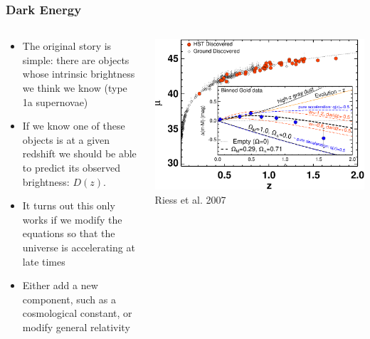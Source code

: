 \documentclass{beamer}
\begin{document}
\frame
{
    \frametitle{Dark Energy}

    \fontsize{9}{0.8\baselineskip}
    \begin{columns}
        \begin{column}{0.5\textwidth}    
            \begin{itemize}

                \item The original story is simple: there are objects whose
                    intrinsic brightness we think we know (type 1a supernovae)

                \item If we know one of these objects is at a given redshift we
                    should be able to predict its observed brightness: $D(z)$.

                \item It turns out this only works if we modify the equations
                    so that the universe is accelerating at late times


                \item Either add a new component, such as a cosmological constant,
                    or modify general relativity

            \end{itemize}
        \end{column}
        \begin{column}{0.5\textwidth}
            \begin{center}
                \includegraphics[width=\textwidth]{riess-distmodulus.pdf}
                \newline
                Riess et al. 2007
            \end{center}
        \end{column}
    \end{columns}
}
\end{document}
